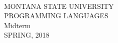 \documentclass[addpoints]{exam}
\begin{document}
\begin{coverpages}
\begin{center}
  {\makebox[3.5in]{\hrulefill}\\
  \vspace{1.5em}
  {\Large MONTANA STATE UNIVERSITY}\\
  \vspace{.5em}
  PROGRAMMING LANGUAGES\\
  \vspace{.5em}
  Midterm\\
  \vspace{.5em}
  SPRING, 2018
  \\
  \vspace{1em}
  \makebox[3.5in]{\hrulefill}\\
  \par}
  \vspace{0.5in}

  \vspace{0.2in}

  \vspace{0.2in}  

  \setlength{\doublerulesep}{0.1in}
  \gradetable[v][questions]
\end{center}

\end{coverpages}
\end{document}
